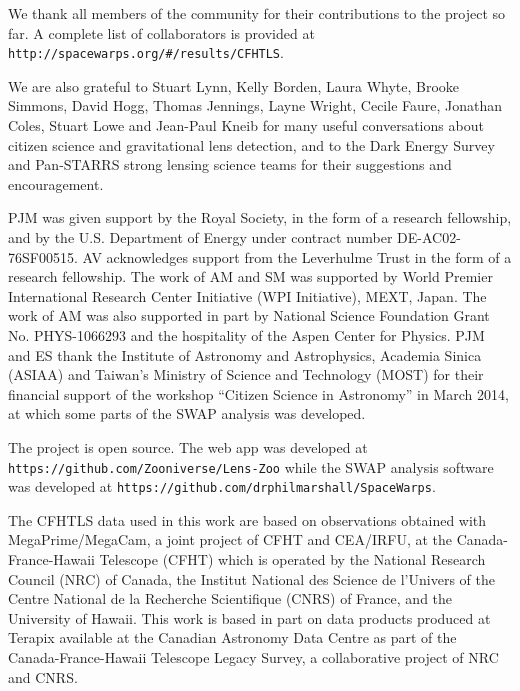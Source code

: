 We thank all \Ncollaboration members of the \sw community for their
contributions to the project so far. A complete list of collaborators is
provided at \texttt{http://spacewarps.org/\#/results/CFHTLS}.

We are also grateful to Stuart Lynn, Kelly Borden, Laura Whyte, Brooke Simmons,
David Hogg, Thomas Jennings, Layne  Wright, Cecile Faure, Jonathan Coles, Stuart
Lowe and Jean-Paul Kneib for many useful conversations about citizen science and
gravitational lens detection, and to the Dark Energy Survey and Pan-STARRS strong
lensing science teams for their suggestions and encouragement.

PJM was given support by the Royal Society, in the form of a research
fellowship, and by the U.S. Department of Energy under contract number DE-AC02-76SF00515.
%
AV acknowledges support from the Leverhulme Trust in the form of a research
fellowship.
%
The work of AM and SM was supported by World Premier International Research
Center Initiative (WPI Initiative), MEXT, Japan. The work of AM was also supported in
part by National Science Foundation Grant No. PHYS-1066293 and the hospitality
of the Aspen Center for Physics.
%
%
PJM and ES thank the Institute of Astronomy and Astrophysics, Academia Sinica
(ASIAA) and Taiwan's Ministry of Science and Technology (MOST) for their
financial support of the workshop ``Citizen Science in Astronomy'' in March
2014, at which some parts of the SWAP analysis was developed.

The \sw project is open source.
The web app was developed at \texttt{https://github.com/Zooniverse/Lens-Zoo}
while the SWAP analysis software was developed at
\texttt{https://github.com/drphilmarshall/SpaceWarps}.

The CFHTLS data used in this work are based on observations obtained with
MegaPrime/MegaCam, a joint project of CFHT and CEA/IRFU, at the
Canada-France-Hawaii Telescope (CFHT) which is operated by the National Research
Council (NRC) of Canada, the Institut National des Science de l'Univers of the
Centre National de la Recherche Scientifique (CNRS) of France, and the
University of Hawaii. This work is based in part on data products produced at
Terapix available at the Canadian Astronomy Data Centre as part of the
Canada-France-Hawaii Telescope Legacy Survey, a collaborative project of NRC and
CNRS.
